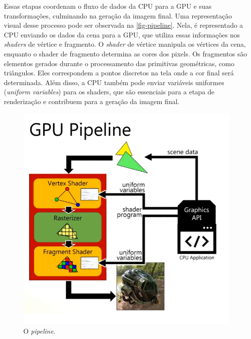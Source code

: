 \documentclass[english, 
               brazil, 
               bsc] %
               {dcomp-abntex2}
\begin{document}


Essas etapas coordenam o fluxo de dados da CPU para a GPU e suas transformações, culminando na geração da imagem final. Uma representação visual desse processo pode ser observada na \autoref{fig-pipeline}. Nela, é representado a CPU enviando os dados da cena para a GPU, que utiliza essas informações nos \textit{shaders} de vértice e fragmento. O \textit{shader} de vértice manipula os vértices da cena, enquanto o shader de fragmento determina as cores dos pixels. Os fragmentos são elementos gerados durante o processamento das primitivas geométricas, como triângulos. Eles correspondem a pontos discretos na tela onde a cor final será determinada. Além disso, a CPU também pode enviar variáveis uniformes (\textit{uniform variables}) para os shaders, que são essenciais para a etapa de renderização e contribuem para a geração da imagem final.


\begin{figure}[H]
        \caption{\label{fig-pipeline}\small O \textit{pipeline}.}
        \begin{center}
            \includegraphics[scale=0.45]{./Imagens/gpu_pipeline.png}
        \end{center}
\end{figure}
\end{document}
